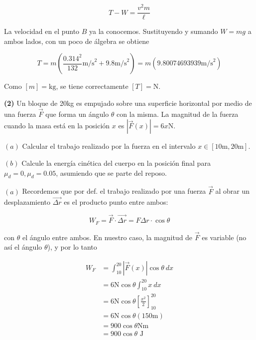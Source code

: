 \documentclass[12pt]{article}
\theoremstyle{definition}
\begin{document}
\begin{equation*}
    T - W = \frac{v^2 m}{\ell}
\end{equation*}

La velocidad en el punto $B$ ya la conocemos. Sustituyendo y sumando $W = mg$ a
ambos lados, con un poco de álgebra se obtiene

\begin{equation*}
    T  = m \left( \frac{0.314^2}{132} \text{m/s}^2 + 9.8 \text{m/s}^2  \right) =
    m(9.80074693939 \text{m/s}^2)
\end{equation*}

Como $[m] = \text{kg}$, se tiene correctamente $[T] = \text{N}$.

\pagebreak 

\begin{shaded}
    \textbf{(2)} Un bloque de 20kg es empujado sobre una superficie horizontal
    por medio de una fuerza $\vec{F}$ que forma un ángulo $\theta$ con la misma.
    La magnitud de la fuerza cuando la masa está en la posición $x$ es 
    $\left| \vec{F}(x) \right| = 6x \text{N}$. 

    $(a)$ Calcular el trabajo realizado por la fuerza en el intervalo $x \in
    [10\text{m}, 20 \text{m}]$.

    $(b)$ Calcule la energía cinética del cuerpo en la posición final para
    $\mu_d = 0, \mu_d = 0.05$, asumiendo que se parte del reposo.

\end{shaded}

$(a)$ Recordemos que por def. el trabajo realizado por una fuerza $\vec{F}$ al
obrar un desplazamiento $\vec{\Delta r}$ es el producto punto entre ambos:

\begin{equation*}
    W_F = \vec{F} \cdot \vec{\Delta r} = F \Delta r \cdot \cos \theta
\end{equation*}

con $\theta$ el ángulo entre ambos. En nuestro caso, la magnitud de $\vec{F}$ es
variable (no así el ángulo $\theta$), y por lo tanto 

\begin{align*}
    W_F 
    &= \int_{10}^{20} \left| \vec{F}(x) \right| \cos \theta ~ dx\\ 
    &= 6\text{N} \cos \theta \int_{10}^{20} x ~ dx\\ 
    &= 6\text{N} \cos \theta \left[ \frac{x^2}{2} \right]_{10}^{20} \\ 
    &=6\text{N}\cos\theta \left( 150\text{m} \right) \\ 
    &=900 \cos \theta \text{Nm} \\ 
    &= 900 \cos\theta \text{ J}
\end{align*}
\end{document}
